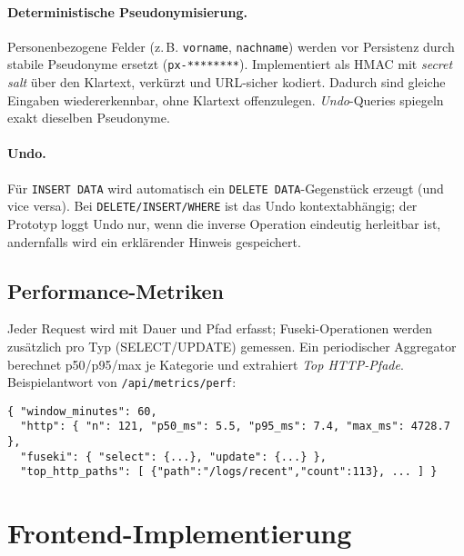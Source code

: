 \paragraph{Deterministische Pseudonymisierung.}
Personenbezogene Felder (z.\,B. \texttt{vorname}, \texttt{nachname}) werden vor Persistenz durch stabile Pseudonyme ersetzt (\texttt{px-********}). Implementiert als HMAC mit \emph{secret salt} über den Klartext, verkürzt und URL-sicher kodiert. Dadurch sind gleiche Eingaben wiedererkennbar, ohne Klartext offenzulegen. \emph{Undo}-Queries spiegeln exakt dieselben Pseudonyme.

\paragraph{Undo.}
Für \texttt{INSERT DATA} wird automatisch ein \texttt{DELETE DATA}-Gegenstück erzeugt (und vice versa). Bei \texttt{DELETE/INSERT/WHERE} ist das Undo kontextabhängig; der Prototyp loggt Undo nur, wenn die inverse Operation eindeutig herleitbar ist, andernfalls wird ein erklärender Hinweis gespeichert.

\subsection{Performance-Metriken}
Jeder Request wird mit Dauer und Pfad erfasst; Fuseki-Operationen werden zusätzlich pro Typ (SELECT/UPDATE) gemessen. Ein periodischer Aggregator berechnet p50/p95/max je Kategorie und extrahiert \emph{Top HTTP-Pfade}. Beispielantwort von \texttt{/api/metrics/perf}:
\begin{verbatim}
{ "window_minutes": 60,
  "http": { "n": 121, "p50_ms": 5.5, "p95_ms": 7.4, "max_ms": 4728.7 },
  "fuseki": { "select": {...}, "update": {...} },
  "top_http_paths": [ {"path":"/logs/recent","count":113}, ... ] }
\end{verbatim}

\section{Frontend-Implementierung}

